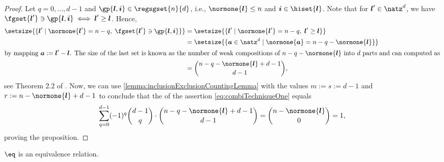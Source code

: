 \propCombiTechniqueOne*

\begin{proof}
  Let $q = 0, \dotsc, d - 1$ and $\gp{\*l,\*i} \in \regsgset{n}{d}$, i.e.,
  $\normone{\*l} \le n$ and $\*i \in \hiset{\*l}$.
  Note that for $\*l' \in \natz^d$, we have
  $\fgset{\*l'} \ni \gp{\*l,\*i} \iff \*l' \ge \*l$.
  Hence,
  \begin{subequations}
    \begin{align}
      \setsize{
        \{\*l' \mid \normone{\*l'} = n - q,\; \fgset{\*l'} \ni \gp{\*l,\*i}\}
      }
      &= \setsize{
        \{\*l' \mid \normone{\*l'} = n - q,\; \*l' \ge \*l\}
      }\\
      &= \setsize{
        \{\*a \in \natz^d \mid \normone{\*a} = n - q - \normone{\*l}\}
      }\\
      \intertext{%
        by mapping $\*a := \*l' - \*l$.
        The size of the last set is
        known as the number of weak compositions
        of $n - q - \normone{\*l}$ into $d$ parts
        and can computed as%
      }
      &= \binom{n - q - \normone{\*l} + d - 1}{d - 1},
    \end{align}
  \end{subequations}
  see Theorem 2.2 of \cite{Bona15Introduction}.
  Now, we can use \cref{lemma:inclusionExclusionCountingLemma}
  with the values
  $m := s := d - 1$ and
  $r := n - \normone{\*l} + d - 1$
  to conclude that the \lhs of the assertion
  \eqref{eq:combiTechniqueOne} equals
  \begin{equation}
    \sum_{q=0}^{d-1} (-1)^q \binom{d-1}{q} \cdot
    \binom{n - q - \normone{\*l} + d - 1}{d - 1}
    = \binom{n - \normone{\*l}}{0}
    = 1,
  \end{equation}
  proving the proposition.
\end{proof}

\begin{shortlemma}
  \label{lemma:combiTechniqueEquivalenceRelation}
  $\eq$ is an equivalence relation.
\end{shortlemma}

